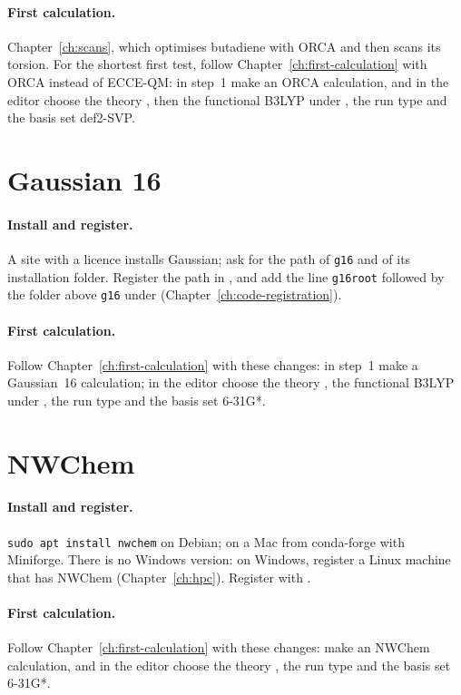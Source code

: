 \paragraph{First calculation.} Chapter~\ref{ch:scans}, which optimises butadiene with ORCA and then scans its torsion. For the shortest first test, follow Chapter~\ref{ch:first-calculation} with ORCA instead of ECCE-QM: in step~1 make an ORCA calculation, and in the editor choose the theory , then the functional B3LYP under , the run type  and the basis set def2-SVP.

\section{Gaussian 16}
\label{sec:run-g16}
\paragraph{Install and register.} A site with a licence installs Gaussian; ask for the path of \texttt{g16} and of its installation folder. Register the path in , and add the line \texttt{g16root} followed by the folder above \texttt{g16} under  (Chapter~\ref{ch:code-registration}).

\paragraph{First calculation.} Follow Chapter~\ref{ch:first-calculation} with these changes: in step~1 make a Gaussian~16 calculation; in the editor choose the theory , the functional B3LYP under , the run type  and the basis set 6-31G*.

\section{NWChem}
\label{sec:run-nwchem}
\paragraph{Install and register.} \texttt{sudo apt install nwchem} on Debian; on a Mac from conda-forge with Miniforge. There is no Windows version: on Windows, register a Linux machine that has NWChem (Chapter~\ref{ch:hpc}). Register with .

\paragraph{First calculation.} Follow Chapter~\ref{ch:first-calculation} with these changes: make an NWChem calculation, and in the editor choose the theory , the run type  and the basis set 6-31G*.

